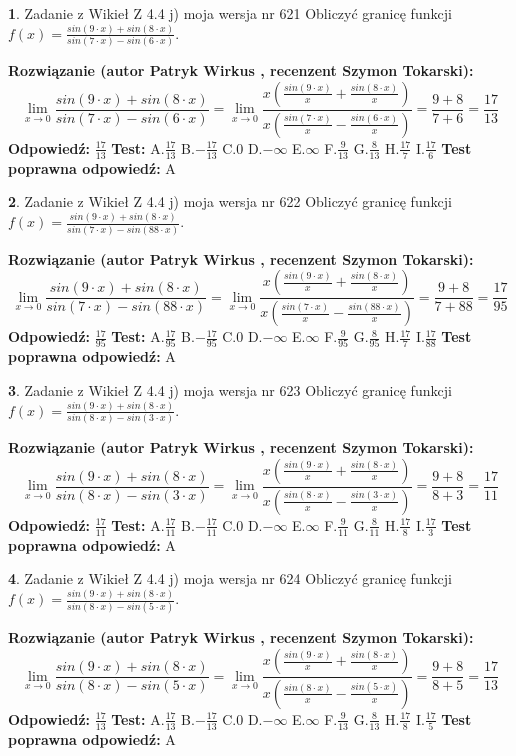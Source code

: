 \documentclass[12pt, a4paper]{article}
\theoremstyle{definition} %
\newtheorem{zad}{}
\newcommand{\zadStart}[1]{\begin{zad}#1\newline}
\newcommand{\zadStop}{\end{zad}}
\newcommand{\rozwStart}[2]{\noindent \textbf{Rozwiązanie (autor #1 , recenzent #2): }\newline}
\newcommand{\rozwStop}{\newline}
\newcommand{\odpStart}{\noindent \textbf{Odpowiedź:}\newline}
\newcommand{\odpStop}{\newline}
\newcommand{\testStart}{\noindent \textbf{Test:}\newline}
\newcommand{\testStop}{\newline}
\newcommand{\kluczStart}{\noindent \textbf{Test poprawna odpowiedź:}\newline}
\newcommand{\kluczStop}{\newline}
\begin{document}
\zadStart{Zadanie z Wikieł Z 4.4 j) moja wersja nr 621}
Obliczyć granicę funkcji $f(x)=\frac{sin(9\cdot x) +sin(8\cdot x)}{sin(7\cdot x) -sin(6\cdot x)}$.
\zadStop
\rozwStart{Patryk Wirkus}{Szymon Tokarski}
$$\lim\limits_{x\to 0}\frac{sin(9\cdot x) +sin(8\cdot x)}{sin(7\cdot x) -sin(6\cdot x)}=\lim\limits_{x\to 0}\frac{x(\frac{sin(9\cdot x)}{x}+\frac{sin(8\cdot x)}{x})}{x(\frac{sin(7\cdot x)}{x}-\frac{sin(6\cdot x)}{x})}=\frac{9+8}{7+6} = \frac{17}{13}$$
\rozwStop
\odpStart
$\frac{17}{13}$
\odpStop
\testStart
A.$\frac{17}{13}$
B.$-\frac{17}{13}$
C.$0$
D.$-\infty$
E.$\infty$
F.$\frac{9}{13}$
G.$\frac{8}{13}$
H.$\frac{17}{7}$
I.$\frac{17}{6}$
\testStop
\kluczStart
A
\kluczStop



\zadStart{Zadanie z Wikieł Z 4.4 j) moja wersja nr 622}
Obliczyć granicę funkcji $f(x)=\frac{sin(9\cdot x) +sin(8\cdot x)}{sin(7\cdot x) -sin(88\cdot x)}$.
\zadStop
\rozwStart{Patryk Wirkus}{Szymon Tokarski}
$$\lim\limits_{x\to 0}\frac{sin(9\cdot x) +sin(8\cdot x)}{sin(7\cdot x) -sin(88\cdot x)}=\lim\limits_{x\to 0}\frac{x(\frac{sin(9\cdot x)}{x}+\frac{sin(8\cdot x)}{x})}{x(\frac{sin(7\cdot x)}{x}-\frac{sin(88\cdot x)}{x})}=\frac{9+8}{7+88} = \frac{17}{95}$$
\rozwStop
\odpStart
$\frac{17}{95}$
\odpStop
\testStart
A.$\frac{17}{95}$
B.$-\frac{17}{95}$
C.$0$
D.$-\infty$
E.$\infty$
F.$\frac{9}{95}$
G.$\frac{8}{95}$
H.$\frac{17}{7}$
I.$\frac{17}{88}$
\testStop
\kluczStart
A
\kluczStop



\zadStart{Zadanie z Wikieł Z 4.4 j) moja wersja nr 623}
Obliczyć granicę funkcji $f(x)=\frac{sin(9\cdot x) +sin(8\cdot x)}{sin(8\cdot x) -sin(3\cdot x)}$.
\zadStop
\rozwStart{Patryk Wirkus}{Szymon Tokarski}
$$\lim\limits_{x\to 0}\frac{sin(9\cdot x) +sin(8\cdot x)}{sin(8\cdot x) -sin(3\cdot x)}=\lim\limits_{x\to 0}\frac{x(\frac{sin(9\cdot x)}{x}+\frac{sin(8\cdot x)}{x})}{x(\frac{sin(8\cdot x)}{x}-\frac{sin(3\cdot x)}{x})}=\frac{9+8}{8+3} = \frac{17}{11}$$
\rozwStop
\odpStart
$\frac{17}{11}$
\odpStop
\testStart
A.$\frac{17}{11}$
B.$-\frac{17}{11}$
C.$0$
D.$-\infty$
E.$\infty$
F.$\frac{9}{11}$
G.$\frac{8}{11}$
H.$\frac{17}{8}$
I.$\frac{17}{3}$
\testStop
\kluczStart
A
\kluczStop



\zadStart{Zadanie z Wikieł Z 4.4 j) moja wersja nr 624}
Obliczyć granicę funkcji $f(x)=\frac{sin(9\cdot x) +sin(8\cdot x)}{sin(8\cdot x) -sin(5\cdot x)}$.
\zadStop
\rozwStart{Patryk Wirkus}{Szymon Tokarski}
$$\lim\limits_{x\to 0}\frac{sin(9\cdot x) +sin(8\cdot x)}{sin(8\cdot x) -sin(5\cdot x)}=\lim\limits_{x\to 0}\frac{x(\frac{sin(9\cdot x)}{x}+\frac{sin(8\cdot x)}{x})}{x(\frac{sin(8\cdot x)}{x}-\frac{sin(5\cdot x)}{x})}=\frac{9+8}{8+5} = \frac{17}{13}$$
\rozwStop
\odpStart
$\frac{17}{13}$
\odpStop
\testStart
A.$\frac{17}{13}$
B.$-\frac{17}{13}$
C.$0$
D.$-\infty$
E.$\infty$
F.$\frac{9}{13}$
G.$\frac{8}{13}$
H.$\frac{17}{8}$
I.$\frac{17}{5}$
\testStop
\kluczStart
A
\kluczStop
\end{document}
